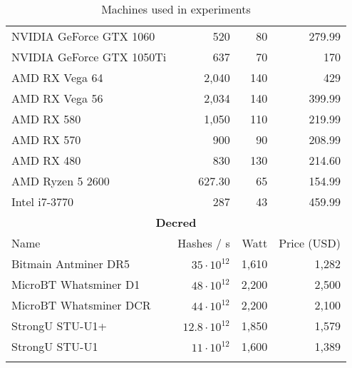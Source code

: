 \begin{longtable}{|p{}|r|r|r|}
  NVIDIA GeForce GTX 1060 & 520 & 80 & 279.99 \\
  NVIDIA GeForce GTX 1050Ti & 637 & 70 & 170 \\
  AMD RX Vega 64 & 2,040 & 140 & 429 \\
  AMD RX Vega 56 & 2,034 & 140 & 399.99 \\
  AMD RX 580 & 1,050 & 110 & 219.99 \\
  AMD RX 570 & 900 & 90 & 208.99 \\
  AMD RX 480 & 830 & 130 & 214.60 \\
  AMD Ryzen 5 2600 & 627.30 & 65 & 154.99 \\
  Intel i7-3770 & 287 & 43 & 459.99 \\
  \hline
  \multicolumn{4}{|c|}{\textbf{Decred}} \\
  \hline
  Name & Hashes / s & Watt & Price (USD)\\
  \hhline{|=|=|=|=|}
  Bitmain Antminer DR5 &   $35 \cdot 10^{12}$ & 1,610 & 1,282   \\
  MicroBT Whatsminer D1 &  $48 \cdot 10^{12}$ & 2,200 & 2,500   \\
  MicroBT Whatsminer DCR & $44 \cdot 10^{12}$ & 2,200 & 2,100   \\
  StrongU STU-U1+ &        $12.8 \cdot 10^{12}$ & 1,850 & 1,579 \\
  StrongU STU-U1 &         $11 \cdot 10^{12}$ & 1,600 & 1,389   \\
  \hline
\caption{Machines used in experiments}
\label{tbl:machines}
\end{longtable}
